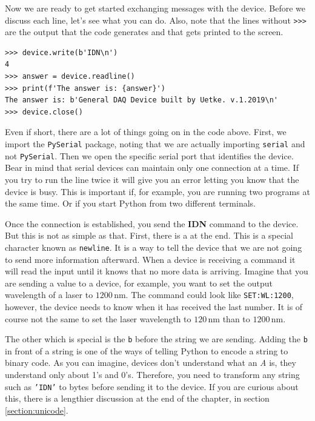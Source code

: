 Now we are ready to get started exchanging messages with the device. Before we discuss each line, let's see what you can do. Also, note that the lines without \texttt{>>>} are the output that the code generates and that gets printed to the screen.

\begin{verbatim}
>>> device.write(b'IDN\n')
4
>>> answer = device.readline()
>>> print(f'The answer is: {answer}')
The answer is: b'General DAQ Device built by Uetke. v.1.2019\n'
>>> device.close()
\end{verbatim}

Even if short, there are a lot of things going on in the code above. First, we import the \texttt{PySerial} package, noting that we are actually importing \texttt{serial} and not \texttt{PySerial}. Then we open the specific serial port that identifies the device. Bear in mind that serial devices can maintain only one connection at a time. If you try to run the line twice it will give you an error letting you know that the device is busy. This is important if, for example, you are running two programs at the same time. Or if you start Python from two different terminals. 

Once the connection is established, you send the \textbf{{IDN}} command to the device. But this is not as simple as that. First, there is a \texttt{\n} at the end. This is a special character known as \texttt{newline}. It is a way to tell the device that we are
not going to send more information afterward. When a device is receiving a command it will read the input until it knows that no more data is arriving. Imagine that you are sending a value to a device, for example, you want to set the output wavelength of a laser to $1200\,\textrm{nm}$. The command could look like  \texttt{SET:WL:1200}, however, the device needs to know when it has received the last number. It is of course not the same to set the laser wavelength to $120\,\textrm{nm}$ than to $1200\,\textrm{nm}$. 

The other which is special is the \texttt{b} before the string we are sending. Adding the \texttt{b} in front of a string is one of the ways of telling Python to encode a string to binary code. As you can imagine, devices don't understand what an \textit{A} is, they understand only about 1's and 0's. Therefore, you need to transform any string such as \texttt{'IDN'} to bytes before sending it to the device. If you are curious about this, there is a lengthier discussion at the end of the chapter, in section \ref{section:unicode}. 

